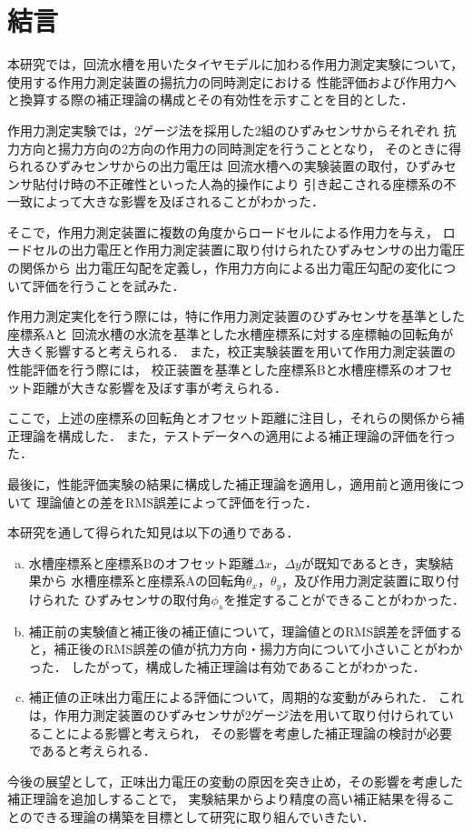 \section{結言}
本研究では，回流水槽を用いたタイヤモデルに加わる作用力測定実験について，
使用する作用力測定装置の揚抗力の同時測定における
性能評価および作用力へと換算する際の補正理論の構成とその有効性を示すことを目的とした．

作用力測定実験では，2ゲージ法を採用した2組のひずみセンサからそれぞれ
抗力方向と揚力方向の2方向の作用力の同時測定を行うこととなり，
そのときに得られるひずみセンサからの出力電圧は
回流水槽への実験装置の取付，ひずみセンサ貼付け時の不正確性といった人為的操作により
引き起こされる座標系の不一致によって大きな影響を及ぼされることがわかった．

そこで，作用力測定装置に複数の角度からロードセルによる作用力を与え，
ロードセルの出力電圧と作用力測定装置に取り付けられたひずみセンサの出力電圧の関係から
出力電圧勾配を定義し，作用力方向による出力電圧勾配の変化について評価を行うことを試みた．

作用力測定実化を行う際には，特に作用力測定装置のひずみセンサを基準とした座標系Aと
回流水槽の水流を基準とした水槽座標系に対する座標軸の回転角が大きく影響すると考えられる．
また，校正実験装置を用いて作用力測定装置の性能評価を行う際には，
校正装置を基準とした座標系Bと水槽座標系のオフセット距離が大きな影響を及ぼす事が考えられる．

ここで，上述の座標系の回転角とオフセット距離に注目し，それらの関係から補正理論を構成した．
また，テストデータへの適用による補正理論の評価を行った．

最後に，性能評価実験の結果に構成した補正理論を適用し，適用前と適用後について
理論値との差をRMS誤差によって評価を行った．

本研究を通して得られた知見は以下の通りである．

\begin{enumerate}[(a)]
    \item   水槽座標系と座標系Bのオフセット距離$\Delta x$，$\Delta y$が既知であるとき，実験結果から
            水槽座標系と座標系Aの回転角$\theta_x$，$\theta_y$，及び作用力測定装置に取り付けられた
            ひずみセンサの取付角$\phi_s$を推定することができることがわかった．\\
    \item   補正前の実験値と補正後の補正値について，理論値とのRMS誤差を評価すると，補正後のRMS誤差の値が抗力方向・揚力方向について小さいことがわかった．
            したがって，構成した補正理論は有効であることがわかった．\\
    \item   補正値の正味出力電圧による評価について，周期的な変動がみられた．
            これは，作用力測定装置のひずみセンサが2ゲージ法を用いて取り付けられていることによる影響と考えられ，
            その影響を考慮した補正理論の検討が必要であると考えられる．
\end{enumerate}

今後の展望として，正味出力電圧の変動の原因を突き止め，その影響を考慮した補正理論を追加しすることで，
実験結果からより精度の高い補正結果を得ることのできる理論の構築を目標として研究に取り組んでいきたい．
